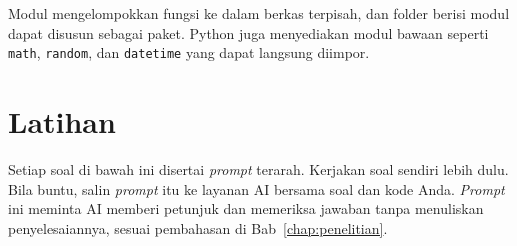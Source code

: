 Modul mengelompokkan fungsi ke dalam berkas terpisah, dan folder berisi modul dapat disusun sebagai paket. Python juga menyediakan modul bawaan seperti \texttt{math}, \texttt{random}, dan \texttt{datetime} yang dapat langsung diimpor.

\section{Latihan}

Setiap soal di bawah ini disertai \textit{prompt} terarah. Kerjakan soal sendiri lebih dulu. Bila buntu, salin \textit{prompt} itu ke layanan AI bersama soal dan kode Anda. \textit{Prompt} ini meminta AI memberi petunjuk dan memeriksa jawaban tanpa menuliskan penyelesaiannya, sesuai pembahasan di Bab~\ref{chap:penelitian}.


